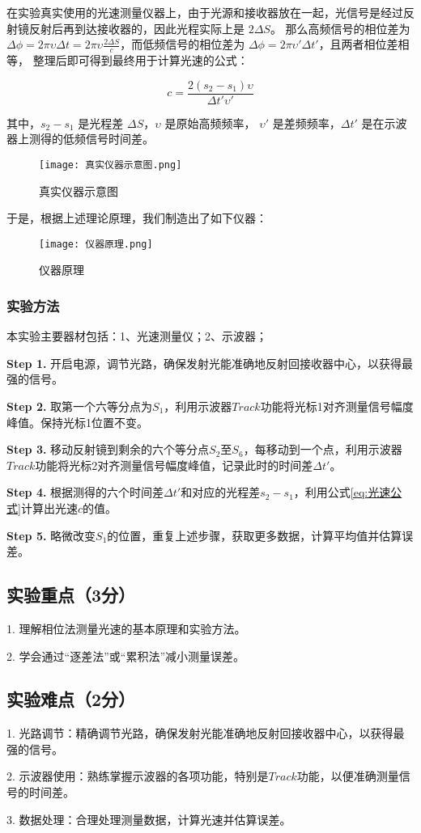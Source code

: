 \documentclass{Preport}
\begin{document}
在实验真实使用的光速测量仪器上，由于光源和接收器放在一起，光信号是经过反射镜反射后再到达接收器的，因此光程实际上是 $2\Delta S$。
那么高频信号的相位差为 $\Delta\phi = 2\pi \upsilon  \Delta t = 2\pi \upsilon  \frac{2\Delta S}{c}$，而低频信号的相位差为 $\Delta\phi = 2\pi \upsilon ' \Delta t'$，且两者相位差相等，
整理后即可得到最终用于计算光速的公式：

\begin{equation}
\label{eq:光速公式}
c = \frac{2(s_2 - s_1)\upsilon }{\Delta t' \upsilon '}
\end{equation}

其中，$s_2 - s_1$ 是光程差 $\Delta S$，$\upsilon $ 是原始高频频率， $\upsilon '$ 是差频频率，$\Delta t'$ 是在示波器上测得的低频信号时间差。

\begin{figure}[H]
    \centering
    \texttt{[image: 真实仪器示意图.png]}
    \caption{真实仪器示意图}
    \label{fig:真实仪器示意图}
\end{figure}

于是，根据上述理论原理，我们制造出了如下仪器：
\begin{figure}[H]
    \centering
    \texttt{[image: 仪器原理.png]}
    \caption{仪器原理}
    \label{fig:仪器原理}
\end{figure}


\subsubsection{实验方法}
本实验主要器材包括：1、光速测量仪；2、示波器；


\textbf{Step 1.} 开启电源，调节光路，确保发射光能准确地反射回接收器中心，以获得最强的信号。

\textbf{Step 2.} 取第一个六等分点为$S_1$，利用示波器$Track$功能将光标1对齐测量信号幅度峰值。保持光标1位置不变。

\textbf{Step 3.} 移动反射镜到剩余的六个等分点$S_2$至$S_6$，每移动到一个点，利用示波器$Track$功能将光标2对齐测量信号幅度峰值，记录此时的时间差$\Delta t'$。

\textbf{Step 4.} 根据测得的六个时间差$\Delta t'$和对应的光程差$s_2 - s_1$，利用公式\eqref{eq:光速公式}计算出光速$c$的值。

\textbf{Step 5.} 略微改变$S_1$的位置，重复上述步骤，获取更多数据，计算平均值并估算误差。




\subsection{实验重点（3分）}
1. 理解相位法测量光速的基本原理和实验方法。

2. 学会通过“逐差法”或“累积法”减小测量误差。

\subsection{实验难点（2分）}
1. 光路调节：精确调节光路，确保发射光能准确地反射回接收器中心，以获得最强的信号。

2. 示波器使用：熟练掌握示波器的各项功能，特别是$Track$功能，以便准确测量信号的时间差。

3. 数据处理：合理处理测量数据，计算光速并估算误差。


\newpage

\end{document}
